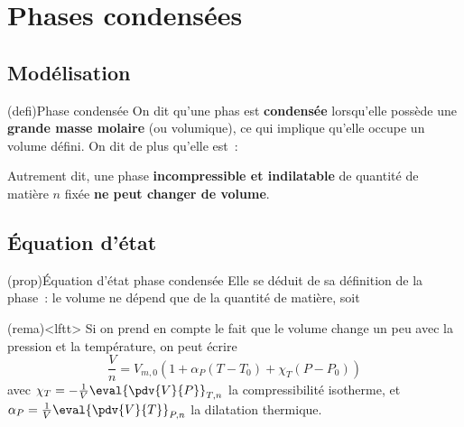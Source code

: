 \documentclass[../../main/main.tex]{subfiles}
\begin{document}
\section{Phases condensées}
\subsection{Modélisation}
\begin{tcb*}(defi){Phase condensée}
	On dit qu'une phas est \textbf{condensée} lorsqu'elle possède une
	\textbf{grande masse molaire} (ou volumique), ce qui implique qu'elle occupe
	un volume défini. On dit de plus qu'elle est~:
	\smallbreak
	\begin{isd}
		\vspace{-15pt}
		\tcblower
		\vspace{-15pt}
	\end{isd}
	Autrement dit, une phase \textbf{incompressible et indilatable} de quantité de
	matière $n$ fixée \textbf{ne peut changer de volume}.
\end{tcb*}

\subsection{Équation d'état}
\begin{tcb*}(prop){Équation d'état phase condensée}
	Elle se déduit de sa définition de la phase~: le volume ne dépend que de la
	quantité de matière, soit
	\psw{%
		\[
			\boxed{\frac{V}{n} = \cte}
		\]
	}%
	\vspace{-15pt}
\end{tcb*}

\begin{tcb}(rema)<lftt>{}
	Si on prend en compte le fait que le volume change un peu avec la pression et
	la température, on peut écrire
	\[
		\frac{V}{n} = V_{m,0} \left( 1 + \alpha_{P} (T-T_0) + \chi_T (P-P_0)\right)
	\]
	avec $\chi_T = -\frac{1}{V} \eval{\pdv{V}{P}}_{T,n}$ la compressibilité
	isotherme, et $\alpha_P = \frac{1}{V} \eval{\pdv{V}{T}}_{P,n}$ la dilatation
	thermique.
\end{tcb}
\end{document}
